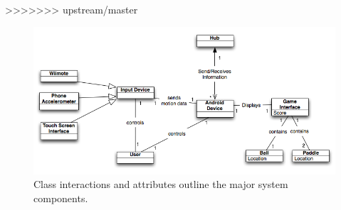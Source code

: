 \documentclass[12pt]{article}
\newenvironment{itemize*}%
  {\begin{itemize}%
  	\setlength{\parsep}{0pt}
    \setlength{\itemsep}{0pt}%
    \setlength{\parskip}{0pt}}%
  {\end{itemize}}
\begin{document}
\begin{itemize*}
>>>>>>> upstream/master
\begin{figure}
\begin{center}
\includegraphics[scale=.7]{domainModel_Android-1.png}
\caption{\label{domainModel}Class interactions and attributes outline the major system components.}
\end{center}
\end{figure}



\end{itemize*}
\end{document}
